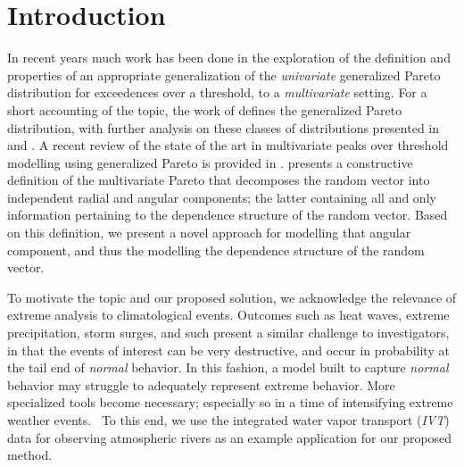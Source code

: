 
\section{Introduction}


In recent years much work has been done in the exploration of the definition and properties of an
  appropriate generalization of the \emph{univariate} generalized Pareto distribution for exceedences
  over a threshold, to a \emph{multivariate} setting.  For a short accounting of the topic, the work of
  \cite{rootzen2006} defines the generalized Pareto distribution, with further analysis on these classes
  of distributions presented in \cite{falk2008} and \cite{michel2008}.  A recent review of the state
  of the art in multivariate peaks over threshold modelling using generalized Pareto is provided in
  \cite{rootzen2018}.  \cite{ferreira2014} presents a constructive definition of the multivariate Pareto
  that decomposes the random vector into independent radial and angular components; the latter
  containing all and only information pertaining to the dependence structure of the random vector.
  Based on this definition, we present a novel approach for modelling that angular component, and thus
  the modelling the dependence structure of the random vector.

To motivate the topic and our proposed solution, we acknowledge the relevance of extreme analysis to
  climatological events.  Outcomes such as heat waves, extreme precipitation, storm surges, and
  such present a similar challenge to investigators, in that the events of interest can be very destructive,
  and occur in probability at the tail end of \emph{normal} behavior.  In this fashion, a model built
  to capture \emph{normal} behavior may struggle to adequately represent extreme behavior.  More
  specialized tools become necessary; especially so in a time of intensifying extreme weather
  events.~\citep{jentsch2007,vousdoukas2018,li2019}  To this end, we use the
  integrated water vapor transport (\emph{IVT}) data for observing atmospheric rivers as an example application
  for our proposed method.

